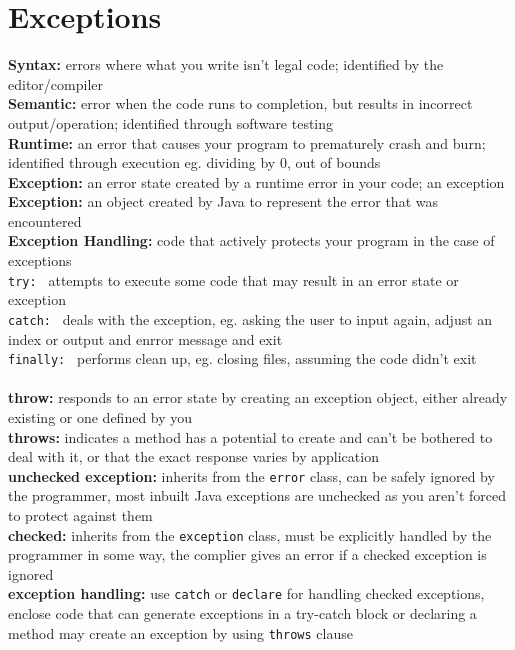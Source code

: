 \documentclass[a4paper,10pt]{article}
\begin{document}
 \section{Exceptions}
\textcolor{PineGreen}{\textbf{Syntax: }} errors where what you write isn't legal code; identified by the editor/compiler \\  
\textcolor{PineGreen}{\textbf{Semantic: }} error when the code runs to completion, but results in incorrect output/operation; identified through software testing \\
\textcolor{PineGreen}{\textbf{Runtime: }} an error that causes your program to prematurely crash and burn; identified through execution eg. dividing by 0, out of bounds \\ 
\textcolor{PineGreen}{\textbf{Exception: }} an error state created by a runtime error in your code; an exception \\
\textcolor{PineGreen}{\textbf{Exception: }} an object created by Java to represent the error that was encountered \\
\textcolor{PineGreen}{\textbf{Exception Handling: }} code that actively protects your program in the case of exceptions \\ 
\textcolor{PineGreen}{\texttt{try: }} attempts to execute some code that may result in an error state or exception \\ 
\textcolor{PineGreen}{\texttt{catch: }} deals with the exception, eg. asking the user to input again, adjust an index or output and enrror message and exit \\ 
\textcolor{PineGreen}{\texttt{finally: }} performs clean up, eg. closing files, assuming the code didn't exit \\ \\
\textcolor{PineGreen}{\textbf{throw: }} responds to an error state by creating an exception object, either already existing or one defined by you \\ 
\textcolor{PineGreen}{\textbf{throws: }} indicates a method has a potential to create and can't be bothered to deal with it, or that the exact response varies by application \\
\textcolor{PineGreen}{\textbf{unchecked exception: }} inherits from the \texttt{error} class, can be safely ignored by the programmer, most inbuilt Java exceptions are unchecked as you aren't forced to protect against them \\  
\textcolor{PineGreen}{\textbf{checked: }} inherits from the \texttt{exception} class, must be explicitly handled by the programmer in some way, the complier gives an error if a checked exception is ignored \\ 
\textcolor{PineGreen}{\textbf{exception handling: }} use \texttt{catch} or \texttt{declare} for handling checked exceptions, enclose code that can generate exceptions in a try-catch block or declaring a method may create an exception by using \texttt{throws} clause \\ 
\end{document}
